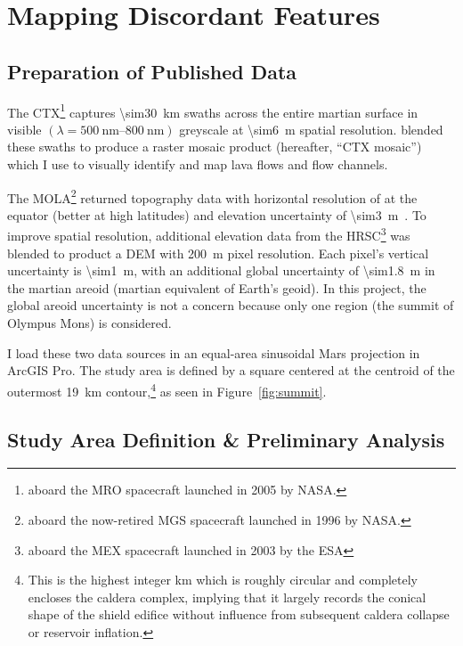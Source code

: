 \section{Mapping Discordant Features}\label{sec:mapping}

\subsection{Preparation of Published Data}

The \acf{CTX}\footnote{aboard the \ac{MRO} spacecraft launched in 2005 by \acs{NASA}.} captures \qty{\sim30}{\km} swaths across the entire martian surface in visible $(\lambda=\qtyrange{500}{800}{\nm})$ greyscale at \qty{\sim6}{\m} spatial resolution. \textcite{Dickson2018AGB} blended these swaths to produce a raster mosaic product (hereafter, ``\ac{CTX} mosaic'') which I use to visually identify and map lava flows and flow channels.

The \acf{MOLA}\footnote{aboard the now-retired \ac{MGS} spacecraft launched in 1996 by \acs{NASA}.} returned topography data with horizontal resolution of  at the equator (better at high latitudes) and elevation uncertainty of \qty{\sim3}{\m}~\parencite{smith_mars_2001}. To improve spatial resolution, additional elevation data from the \ac{HRSC}\footnote{aboard the \ac{MEX} spacecraft launched in 2003 by the \ac{ESA}} was blended to product a \ac{DEM} with \qty{200}{\m} pixel resolution. Each pixel's vertical uncertainty is \qty{\sim1}{\m}, with an additional global uncertainty of \qty{\sim1.8}{\m} in the martian areoid (martian equivalent of Earth's geoid). In this project, the global areoid uncertainty is not a concern because only one region (the summit of Olympus Mons) is considered.

I load these two data sources in an equal-area sinusoidal Mars projection in ArcGIS Pro. The study area is defined by a square  centered at the centroid of the outermost \qty{19}{\km} contour,\footnote{This is the highest integer \unit{km} which is roughly circular and completely encloses the caldera complex, implying that it largely records the conical shape of the shield edifice without influence from subsequent caldera collapse or reservoir inflation.} as seen in Figure~\ref{fig:summit}.

\subsection{Study Area Definition \& Preliminary Analysis}

